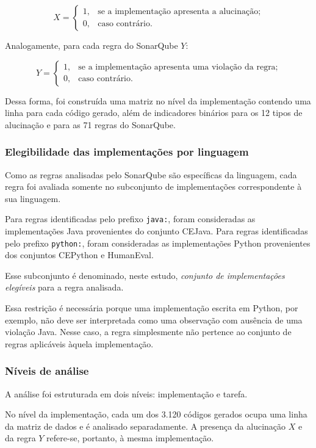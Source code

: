 \[
X =
\begin{cases}
1, & \text{se a implementação apresenta a alucinação;}\\
0, & \text{caso contrário.}
\end{cases}
\]

Analogamente, para cada regra do SonarQube $Y$:

\[
Y =
\begin{cases}
1, & \text{se a implementação apresenta uma violação da regra;}\\
0, & \text{caso contrário.}
\end{cases}
\]

Dessa forma, foi construída uma matriz no nível da implementação contendo uma linha para cada código gerado, além de indicadores binários para os 12 tipos de alucinação e para as 71 regras do SonarQube.

\subsubsection{Elegibilidade das implementações por linguagem}

Como as regras analisadas pelo SonarQube são específicas da linguagem, cada regra foi avaliada somente no subconjunto de implementações correspondente à sua linguagem.

Para regras identificadas pelo prefixo \texttt{java:}, foram consideradas as implementações Java provenientes do conjunto CEJava. Para regras identificadas pelo prefixo \texttt{python:}, foram consideradas as implementações Python provenientes dos conjuntos CEPython e HumanEval.

Esse subconjunto é denominado, neste estudo, \textit{conjunto de implementações elegíveis} para a regra analisada.

Essa restrição é necessária porque uma implementação escrita em Python, por exemplo, não deve ser interpretada como uma observação com ausência de uma violação Java. Nesse caso, a regra simplesmente não pertence ao conjunto de regras aplicáveis àquela implementação.

\subsubsection{Níveis de análise}

A análise foi estruturada em dois níveis: implementação e tarefa.

No nível da implementação, cada um dos 3.120 códigos gerados ocupa uma linha da matriz de dados e é analisado separadamente. A presença da alucinação $X$ e da regra $Y$ refere-se, portanto, à mesma implementação.

